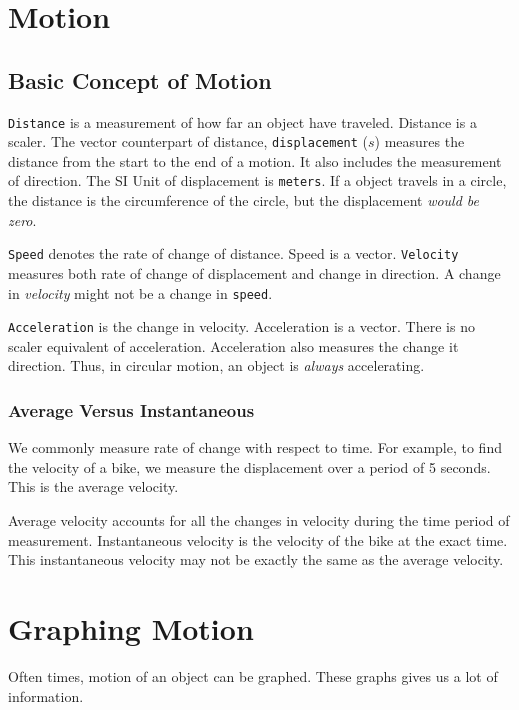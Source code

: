 \documentclass[../notes.tex]{subfiles}
\begin{document}
\section{Motion}

\subsection{Basic Concept of Motion}

\texttt{Distance} is a measurement of how far an object have traveled. 
Distance is a scaler.
The vector counterpart of distance, \texttt{displacement} ($s$) measures the distance from the start to the end of a motion.
It also includes the measurement of direction.
The SI Unit of displacement is \texttt{meters}.
If a object travels in a circle, the distance is the circumference of the circle, but the displacement \textit{would be zero}.

\texttt{Speed} denotes the rate of change of distance.
Speed is a vector.
\texttt{Velocity} measures both rate of change of displacement and change in direction.
A change in \textit{velocity} might not be a change in \texttt{speed}.

\texttt{Acceleration} is the change in velocity.
Acceleration is a vector.
There is no scaler equivalent of acceleration.
Acceleration also measures the change it direction.
Thus, in circular motion, an object is \textit{always} accelerating.

\subsubsection{Average Versus Instantaneous}
We commonly measure rate of change with respect to time.
For example, to find the velocity of a bike, we measure the displacement over a period of 5 seconds.
This is the average velocity.

Average velocity accounts for all the changes in velocity during the time period of measurement.
Instantaneous velocity is the velocity of the bike at the exact time.
This instantaneous velocity may not be exactly the same as the average velocity.

\section{Graphing Motion}
Often times, motion of an object can be graphed. 
These graphs gives us a lot of information.
\end{document}
